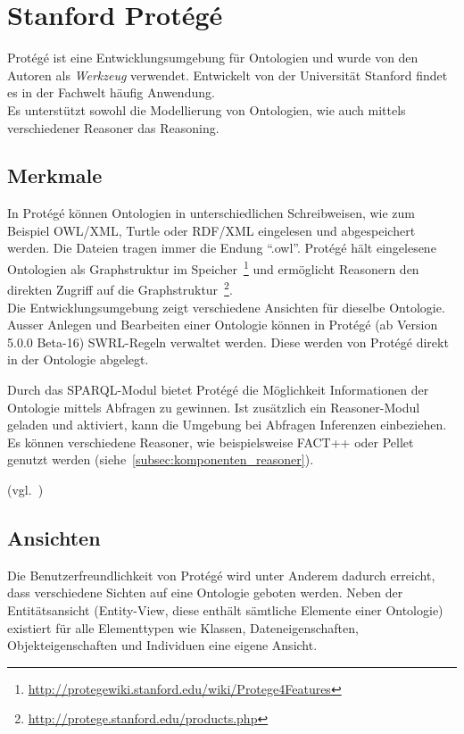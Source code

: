 \section{Stanford Protégé}
\label{sec:komponenten_protege}
Protégé ist eine Entwicklungsumgebung für Ontologien und wurde von den Autoren als \textit{Werkzeug} verwendet. Entwickelt von der Universität Stanford findet es in der Fachwelt häufig Anwendung.\\
Es unterstützt sowohl die Modellierung von Ontologien, wie auch mittels verschiedener Reasoner das Reasoning.

\subsection{Merkmale}
\label{subsec:komponenten_protege_features}
In Protégé können Ontologien in unterschiedlichen Schreibweisen, wie zum Beispiel OWL/XML, Turtle oder RDF/XML eingelesen und abgespeichert werden. Die Dateien tragen immer die Endung ``.owl''. Protégé hält eingelesene Ontologien als Graphstruktur im Speicher~\footnote{\url{http://protegewiki.stanford.edu/wiki/Protege4Features}} und ermöglicht Reasonern den direkten Zugriff auf die Graphstruktur~\footnote{\url{http://protege.stanford.edu/products.php}}.\\
Die Entwicklungsumgebung zeigt verschiedene Ansichten für dieselbe Ontologie. \\
Ausser Anlegen und Bearbeiten einer Ontologie können in Protégé (ab Version 5.0.0 Beta-16) SWRL-Regeln verwaltet werden. Diese werden von Protégé direkt in der Ontologie abgelegt.

Durch das SPARQL-Modul bietet Protégé die Möglichkeit Informationen der Ontologie mittels Abfragen zu gewinnen. Ist zusätzlich ein Reasoner-Modul geladen und aktiviert, kann die Umgebung bei Abfragen Inferenzen einbeziehen. Es können verschiedene Reasoner, wie beispielsweise FACT++ oder Pellet genutzt werden (siehe~\ref{subsec:komponenten_reasoner}).

(vgl.~\cite{protegeFeatures})

\subsection{Ansichten}
\label{subsec:komponenten_protege_view}

Die Benutzerfreundlichkeit von Protégé wird unter Anderem dadurch erreicht, dass verschiedene Sichten auf eine Ontologie geboten werden. Neben der Entitätsansicht (Entity-View, diese enthält sämtliche Elemente einer Ontologie) existiert für alle Elementtypen wie Klassen, Dateneigenschaften, Objekteigenschaften und Individuen eine eigene Ansicht.

